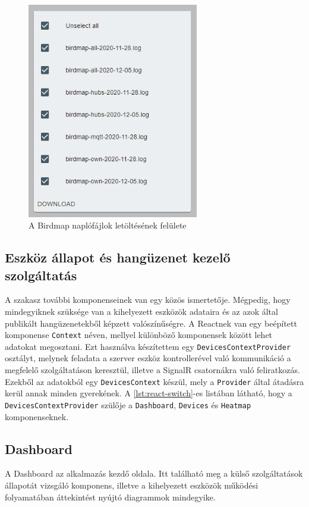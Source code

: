 \begin{figure}[!ht]
    \centering
    \includegraphics[width=75mm, keepaspectratio]{figures/birdmap-logs.png}
    \caption{A Birdmap naplófájlok letöltésének felülete}
    \label{fig:birdmap-logs}
\end{figure}
\subsection{Eszköz állapot és hangüzenet kezelő szolgáltatás}
A szakasz további komponenseinek van egy közös ismertetője. Mégpedig, hogy mindegyiknek szüksége van a kihelyezett eszközök adataira
és az azok által publikált hangüzenetekből képzett valószínűségre.
A Reactnek van egy beépített komponense \verb+Context+ \cite{react-context} néven, mellyel különböző komponensek között lehet adatokat megosztani.
Ezt használva készítettem egy \verb+DevicesContextProvider+ osztályt, melynek feladata a szerver eszköz kontrollerével való kommunikáció a megfelelő szolgáltatáson keresztül,
illetve a SignalR csatornákra való feliratkozás. Ezekből az adatokból egy \verb+DevicesContext+ készül, mely a \verb+Provider+ által átadásra kerül annak minden gyerekének.
A \ref{lst:react-switch}-es listában látható, hogy a \verb+DevicesContextProvider+ szülője a \verb+Dashboard+, \verb+Devices+ és \verb+Heatmap+ komponenseknek.

\subsection{Dashboard}
A Dashboard az alkalmazás kezdő oldala. Itt található meg a külső szolgáltatások állapotát vizsgáló komponens,
illetve a kihelyezett eszközök működési folyamatában áttekintést nyújtó diagrammok mindegyike.


